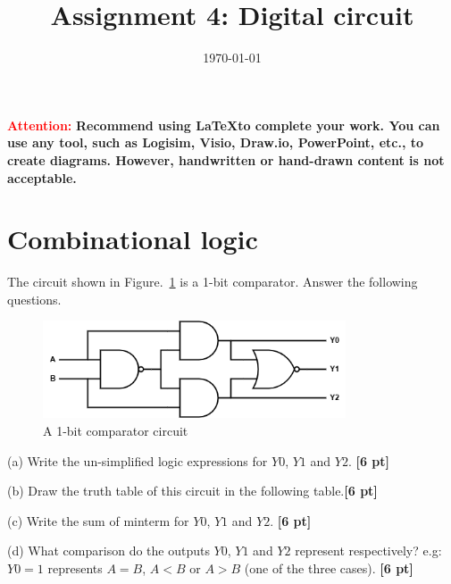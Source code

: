 \documentclass[a4paper]{article}
\date{\today}
\title{Assignment 4: Digital circuit}
\begin{document}
\header{}
\textcolor{red}{\textbf{Attention: }}
\textbf{Recommend using \LaTeX \space to complete your work. You can use any tool, such as Logisim, Visio, Draw.io, PowerPoint, etc., to create diagrams. However, handwritten or hand-drawn content is not acceptable.}

\section{Combinational logic}
The circuit shown in Figure.~\ref{fig:Q1_circuit} is a 1-bit comparator. Answer the following questions. \\

\begin{figure}[htbp]
    \centering
    \includegraphics[width=0.8\textwidth]{Q1_circuit.png}
    \caption{A 1-bit comparator circuit}
    \label{fig:Q1_circuit}
\end{figure}

(a) Write the un-simplified logic expressions for $Y0$, $Y1$ and $Y2$. \textbf{[6 pt]}

(b) Draw the truth table of this circuit in the following table.\textbf{[6 pt]}

(c) Write the sum of minterm for $Y0$, $Y1$ and $Y2$. \textbf{[6 pt]}

(d) What comparison do the outputs $Y0$, $Y1$ and $Y2$ represent respectively? e.g: $Y0=1$ represents $A=B$, $A<B$ or $A>B$ (one of the three cases). \textbf{[6 pt]}
\end{document}
